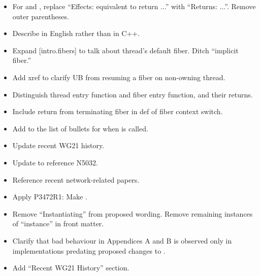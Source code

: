 \begin{itemize}
\begin{itemize}
        \item Replace string of ``, then...'' with ``...the following sequence of steps in order.''
        \item Define composite \emph{internal-resume} with an internal decision.
        \item `` can be other than . ...'' =>
              `` can be other than ; ...''
        \item Add ``Suspends the running fiber'' to \effects.
    \end{itemize}
    \item For \emptyfn and , replace ``Effects: equivalent
          to return ...'' with ``Returns: ...''. Remove outer parentheses.
    \item Describe  in English rather than in C++.
    \item Expand [intro.fibers] to talk about thread's default fiber. Ditch
              ``implicit fiber.''
    \item Add xref to clarify UB from resuming a fiber on non-owning thread.
    \item Distinguish thread entry function and fiber entry function,
              and their returns.
    \item Include return from terminating fiber in def of fiber context
              switch.
    \item Add to the list of bullets for when  is called.
\end{itemize}


\begin{itemize}
    \item Update recent WG21 history.
\end{itemize}


\begin{itemize}
    \item Update to reference N5032.
    \item Reference recent network-related papers.
\end{itemize}


\begin{itemize}
    \item Apply P3472R1: Make \fiber\cpp{::}\canresume {}.
    \item Remove ``Instantiating'' from proposed wording. Remove remaining
          instances of ``instance'' in front matter.
    \item Clarify that bad behaviour in Appendices A and B is observed only in
          implementations predating proposed changes to .
    \item Add ``Recent WG21 History'' section.
\end{itemize}

